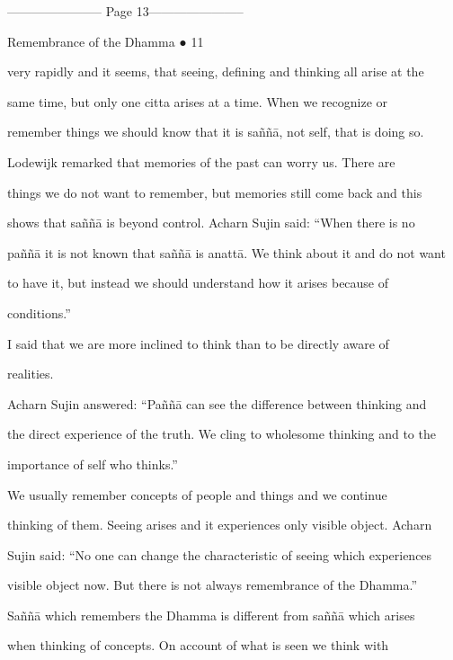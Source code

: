 ----------------------- Page 13-----------------------

                                                      Remembrance of the Dhamma ● 11 



very  rapidly  and  it  seems, that  seeing,  defining  and  thinking  all  arise  at  the  

same   time,   but   only   one   citta   arises   at   a   time.   When   we   recognize   or  

remember things we should know that it is saññā, not self, that is doing so. 

   Lodewijk   remarked   that   memories   of   the   past   can   worry   us.   There   are  

things we  do  not want to  remember, but  memories  still  come back  and this  

shows  that  saññā  is  beyond  control.  Acharn   Sujin  said:  “When  there  is  no  

paññā it is not known that saññā is anattā. We think about it and do not want  

to   have   it,   but   instead   we   should   understand   how   it   arises   because   of  

conditions.” 

   I  said  that   we   are  more   inclined   to   think   than   to   be   directly   aware  of  

realities.  

   Acharn Sujin answered: “Paññā can see the difference between thinking and  

the direct experience of the truth. We cling to wholesome thinking and to the  

importance of self who thinks.” 

   We   usually   remember   concepts   of   people   and   things   and   we   continue  

thinking of them.  Seeing  arises and it experiences only visible object. Acharn  

Sujin said: “No one can change the characteristic of seeing which experiences  

visible object now. But there is not always remembrance of the Dhamma.”  

   Saññā which remembers the Dhamma is different from saññā which arises  

when   thinking   of   concepts.   On   account   of   what   is   seen   we   think   with  

